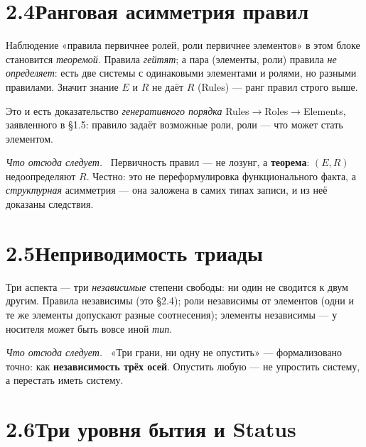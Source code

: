 \documentclass[12pt,a4paper]{article}
\newcommand{\rezultat}{\medskip\noindent\emph{Что отсюда следует.}\ }
\begin{document}
\section*{2.4\quad Ранговая асимметрия правил}

Наблюдение «правила первичнее ролей, роли первичнее элементов» в этом блоке становится
\emph{теоремой}. Правила \emph{гейтят}; а пара (элементы, роли) правила \emph{не определяет}: есть
две системы с одинаковыми элементами и ролями, но разными правилами. Значит знание $E$ и $R$ не
даёт $R$ (Rules) --- ранг правил строго выше.

Это и есть доказательство \emph{генеративного порядка} Rules${}\to{}$Roles${}\to{}$Elements,
заявленного в §1.5: правило задаёт возможные роли, роли --- что может стать элементом.

\rezultat
Первичность правил --- не лозунг, а \textbf{теорема}: $(E,R)$ недоопределяют $R$. Честно: это не
переформулировка функционального факта, а \emph{структурная} асимметрия --- она заложена в самих
типах записи, и из неё доказаны следствия.

\section*{2.5\quad Неприводимость триады}

Три аспекта --- три \emph{независимые} степени свободы: ни один не сводится к двум другим. Правила
независимы (это §2.4); роли независимы от элементов (одни и те же элементы допускают разные
соотнесения); элементы независимы --- у носителя может быть вовсе иной \emph{тип}.

\rezultat
«Три грани, ни одну не опустить» --- формализовано точно: как \textbf{независимость трёх осей}.
Опустить любую --- не упростить систему, а перестать иметь систему.

\section*{2.6\quad Три уровня бытия и Status}
\end{document}
